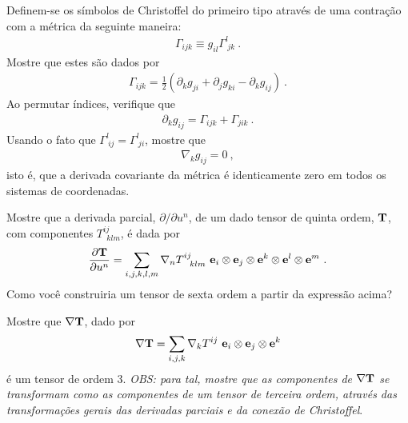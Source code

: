 \documentclass[a4paper,12pt]{article}
\begin{document}

\indent \par Definem-se os símbolos de Christoffel do primeiro tipo através de uma contração com a métrica da seguinte maneira:   
%
\begin{eqnarray}
  \nonumber
  \Gamma_{ijk}\equiv g_{il}\Gamma^{l}_{~jk} ~.
 \end{eqnarray}
%
\noindent Mostre que estes são dados por
%
\begin{eqnarray}
  \nonumber
  \Gamma_{ijk}=\frac{1}{2}\left( \partial_{k}g_{ji} + \partial_{j}g_{ki} - \partial_{k}g_{ij} \right) ~.
 \end{eqnarray}
%
\newpage
\noindent Ao permutar índices, verifique que 
%
\begin{eqnarray}
  \nonumber
  \partial_{k}g_{ij}=\Gamma_{ijk} + \Gamma_{jik} ~.
 \end{eqnarray}
%
\noindent Usando o fato que $\Gamma^{l}_{~ij}=\Gamma^{l}_{~ji}$, mostre que 
%
\begin{eqnarray}
  \nonumber
  \nabla_{k} g_{ij}=0 ~,
 \end{eqnarray}
%
\noindent isto é, que a derivada covariante da métrica é identicamente zero em todos os sistemas de coordenadas.\\




\indent \par Mostre que a derivada parcial, $\partial/\partial u^{n}$, de um dado tensor de quinta ordem, ${\bf{T}}$, com componentes $T^{ij}_{~~klm}$, é dada por
%
\begin{eqnarray}
  \nonumber
  \frac{\partial {\bf{T}}}{\partial{u^{n}}} =\sum_{i,j,k,l,m} \nabla_{n}T^{ij}_{~~klm}~ {\bf{e}}_{i}\otimes{\bf{e}}_{j}\otimes{\bf{e}}^{k}\otimes{\bf{e}}^{l}\otimes{\bf{e}}^{m} ~.
 \end{eqnarray}
%
\noindent Como você construiria um tensor de sexta ordem a partir da expressão acima?\\


\indent \par Mostre que ${\bf{\nabla T}}$, dado por
%
\begin{eqnarray}
  \nonumber
  {\bf{\nabla T}} = \sum_{i,j,k}\nabla_{k}T^{ij}~{\bf{e}}_{i}\otimes{\bf{e}}_{j}\otimes{\bf{e}}^{k}
 \end{eqnarray}
%
\noindent é um tensor de ordem 3. {\it{OBS: para tal, mostre que as componentes de ${\bf{\nabla T}}$ se transformam como as componentes de um tensor de terceira ordem, através das transformações gerais das derivadas parciais e da conexão de Christoffel}}.
\end{document}
